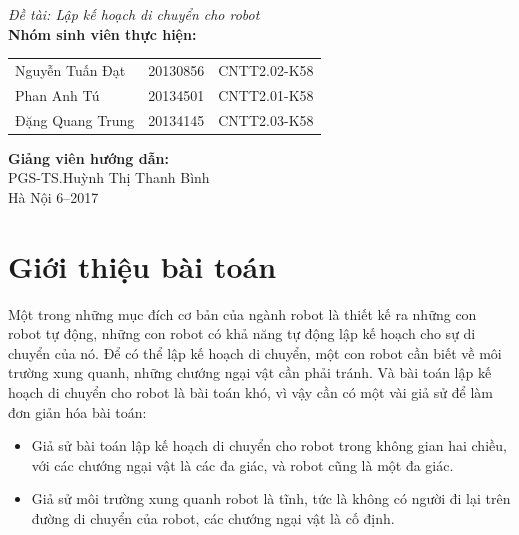 \documentclass[a4paper,12pt]{report}
\renewcommand{\contentsname}{Mục lục}
\begin{document}
\begin{center}
{\fontsize{18}{20}\selectfont \emph{Đề tài: Lập kế hoạch di chuyển cho robot}}\\[2cm]
\hspace{-5cm}\fontsize{14}{16}\selectfont \textbf{Nhóm sinh viên thực hiện:}\\[0.1cm] 
\begin{longtable}{l c c}
Nguyễn Tuấn Đạt & 20130856 & CNTT2.02-K58 \\
Phan Anh Tú &   20134501 & CNTT2.01-K58\\
Đặng Quang Trung & 20134145 & CNTT2.03-K58 \\
\end{longtable}
\vspace{0.5cm}
\hspace{-6cm}\fontsize{14}{16}\selectfont \textbf{Giảng viên hướng dẫn:}\\[0.1cm]
\hspace{-2.7cm}\fontsize{14}{16}\selectfont PGS-TS.Huỳnh Thị Thanh Bình \\[3cm]
\fontsize{16}{19}\selectfont Hà Nội 6--2017
\end{center}
\newpage
\pdfbookmark{\contentsname}{toc}
\tableofcontents
\listoffigures

\chapter{Giới thiệu bài toán}
Một trong những mục đích cơ bản của ngành robot là thiết kế ra những con robot tự động, những con robot có khả năng tự động lập kế hoạch cho sự di chuyển của nó. Để có thể lập kế hoạch di chuyển, một con robot cần biết về môi trường xung quanh, những chướng ngại vật cần phải tránh. Và bài toán lập kế hoạch di chuyển cho robot là bài toán khó, vì vậy cần có một vài giả sử để làm đơn giản hóa bài toán: 
\begin{itemize}
\item Giả sử bài toán lập kế hoạch di chuyển cho robot trong không gian hai chiều, với các chướng ngại vật là các đa giác, và robot cũng là một đa giác. 
\item Giả sử môi trường xung quanh robot là tĩnh, tức là không có người đi lại trên đường di chuyển của robot, các chướng ngại vật là cố định.
\end{itemize}
\end{document}
